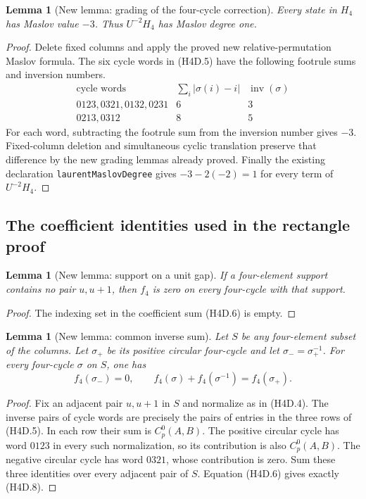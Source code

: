 \documentclass[11pt,oneside]{report}
\newtheorem{lemma}[theorem]{Lemma}
\theoremstyle{definition}
\numberwithin{equation}{section}
\newcommand{\decl}[1]{\textnormal{\nolinkurl{#1}}}
\begin{document}
\begin{lemma}[New lemma: grading of the four-cycle correction]
\label{J21:lem:h4-density-degree}
Every state in $H_4$ has Maslov value $-3$. Thus $U^{-2}H_4$ has
Maslov degree one.
\end{lemma}
\begin{proof}
Delete fixed columns and apply the proved new relative-permutation
Maslov formula. The six cycle words in (H4D.5) have the following
footrule sums and inversion numbers.
\[
\begin{array}{c|c|c}
 \text{cycle words}&\sum_i|\sigma(i)-i|&\operatorname{inv}(\sigma)\\\hline
 0123, 0321, 0132, 0231&6&3\\
 0213, 0312&8&5
\end{array}
\]
For each word, subtracting the footrule sum from the inversion number
gives $-3$. Fixed-column deletion and simultaneous cyclic translation
preserve that difference by the new grading lemmas already proved.
Finally the existing declaration \decl{laurentMaslovDegree} gives
$-3-2(-2)=1$ for every term of $U^{-2}H_4$.
\end{proof}

\subsection{The coefficient identities used in the rectangle proof}

\begin{lemma}[New lemma: support on a unit gap]
\label{J21:lem:h4-unit-support}
If a four-element support contains no pair $u,u+1$, then $f_4$ is
zero on every four-cycle with that support.
\end{lemma}
\begin{proof}
The indexing set in the coefficient sum (H4D.6) is empty.
\end{proof}

\begin{lemma}[New lemma: common inverse sum]
\label{J21:lem:h4-common-inverse-sum}
Let $S$ be any four-element subset of the columns. Let $\sigma_+$
be its positive circular four-cycle and let $\sigma_- =\sigma_+^{-1}$.
For every four-cycle $\sigma$ on $S$, one has
\[
 f_4(\sigma_-)=0,\qquad
 f_4(\sigma)+f_4(\sigma^{-1})=f_4(\sigma_+).
 \tag{H4D.8}
\]
\end{lemma}
\begin{proof}
Fix an adjacent pair $u,u+1$ in $S$ and normalize as in (H4D.4).
The inverse pairs of cycle words are precisely the pairs of entries
in the three rows of (H4D.5). In each row their sum is $C_p^0(A,B)$.
The positive circular cycle has word $0123$ in every such
normalization, so its contribution is also $C_p^0(A,B)$.
The negative circular cycle has word $0321$, whose contribution is
zero. Sum these three identities over every adjacent pair of $S$.
Equation (H4D.6) gives exactly (H4D.8).
\end{proof}
\end{document}
